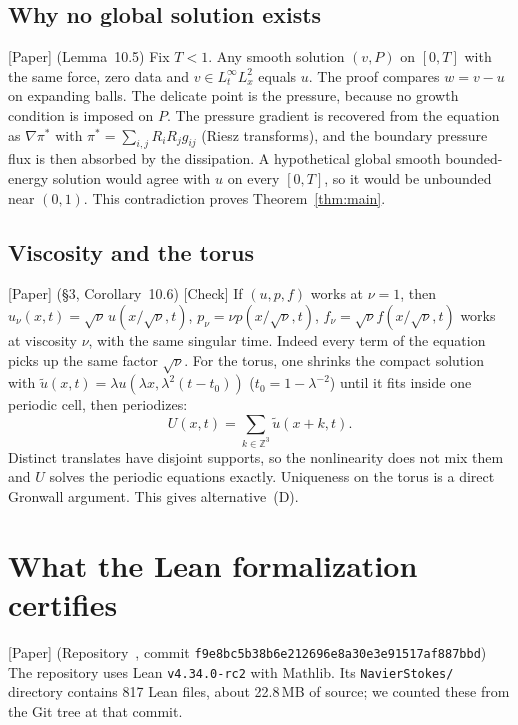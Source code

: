 \documentclass[11pt]{article}
\theoremstyle{plain}
\theoremstyle{remark}
\newcommand{\paper}{\textsf{\small[Paper]}}
\newcommand{\chk}{\textsf{\small[Check]}}
\begin{document}
\subsection{Why no global solution exists}
\paper{} (Lemma~10.5) Fix $T<1$. Any smooth solution $(v,P)$ on $[0,T]$ with the same force, zero data and $v\in L^\infty_tL^2_x$ equals $u$. The proof compares $w=v-u$ on expanding balls. The delicate point is the pressure, because no growth condition is imposed on $P$. The pressure gradient is recovered from the equation as $\nabla\pi^*$ with $\pi^*=\sum_{i,j}R_iR_jg_{ij}$ (Riesz transforms), and the boundary pressure flux is then absorbed by the dissipation. A hypothetical global smooth bounded-energy solution would agree with $u$ on every $[0,T]$, so it would be unbounded near $(0,1)$. This contradiction proves Theorem~\ref{thm:main}.

\subsection{Viscosity and the torus}\label{sec:torus}
\paper{} (\S3, Corollary~10.6) \chk{} If $(u,p,f)$ works at $\nu=1$, then $u_\nu(x,t)=\sqrt\nu\,u(x/\sqrt\nu,t)$, $p_\nu=\nu p(x/\sqrt\nu,t)$, $f_\nu=\sqrt\nu f(x/\sqrt\nu,t)$ works at viscosity $\nu$, with the same singular time. Indeed every term of the equation picks up the same factor $\sqrt\nu$. For the torus, one shrinks the compact solution with $\tilde u(x,t)=\lambda u(\lambda x,\lambda^2(t-t_0))$ ($t_0=1-\lambda^{-2}$) until it fits inside one periodic cell, then periodizes:
\[
U(x,t)=\sum_{k\in\mathbb Z^3}\tilde u(x+k,t).
\]
Distinct translates have disjoint supports, so the nonlinearity does not mix them and $U$ solves the periodic equations exactly. Uniqueness on the torus is a direct Gronwall argument. This gives alternative~(D).

\section{What the Lean formalization certifies}\label{sec:lean}

\paper{} (Repository~\cite{OAILean}, commit \texttt{f9e8bc5b38b6e212696e8a30e3e91517af887bbd}) The repository uses Lean \texttt{v4.34.0-rc2} with Mathlib. Its \texttt{NavierStokes/} directory contains 817 Lean files, about 22.8\,MB of source; we counted these from the Git tree at that commit.
\end{document}
